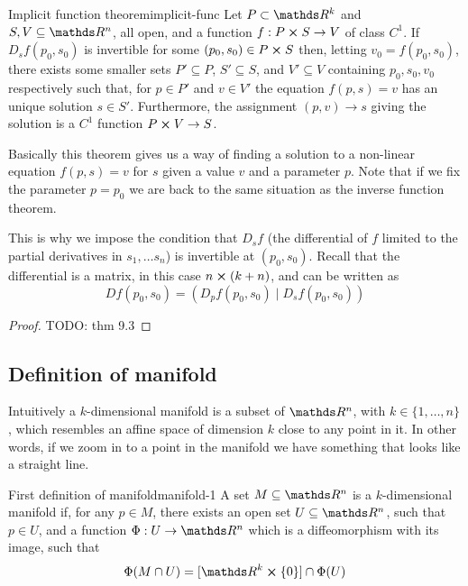 \documentclass[12pt]{extarticle}
\begin{document}
\begin{theorem}{Implicit function theorem}{implicit-func}
	Let $P \subset \R^k$ and $S, V \subseteq \R^n$, all open, and a function $f: P \cross S \to V$ of
	class $C^1$.
	If $D_s f(p_0, s_0)$ is invertible for some $(p_0, s_0) \in P \cross S$ then, letting
	$v_0 = f(p_0, s_0)$, there exists some smaller sets $P' \subseteq P$, $S'\subseteq S$, and
	$V' \subseteq V$ containing $p_0, s_0, v_0$ respectively such that, for $p \in P'$ and $v \in V'$
	the equation $f(p, s) = v$ has an unique solution $s \in S'$.
	Furthermore, the assignment $(p, v) \to s$ giving the solution is a $C^1$ function
	$P \cross V \to S$.
\end{theorem}

Basically this theorem gives us a way of finding a solution to a non-linear equation $f(p, s) = v$
for $s$ given a value $v$ and a parameter $p$.
Note that if we fix the parameter $p = p_0$ we are back to the same situation as the inverse
function theorem.

This is why we impose the condition that $D_s f$ (the differential of $f$ limited to the partial
derivatives in $s_1, \dots s_n$) is invertible at $(p_0, s_0)$.
Recall that the differential is a matrix, in this case $n \cross (k + n)$, and can be written as
\begin{equation}
	Df(p_0, s_0) = (D_p f(p_0, s_0) \mid D_s f(p_0, s_0))
\end{equation}

\begin{proof}
	TODO: thm 9.3
\end{proof}

\subsection{Definition of manifold}

Intuitively a $k$-dimensional manifold is a subset of $\R^n$, with $k \in \{1, \dots, n\}$, which
resembles an affine space of dimension $k$ close to any point in it. In other words, if we zoom in
to a point in the manifold we have something that looks like a straight line.

\begin{definition}{First definition of manifold}{manifold-1}
	A set $M \subseteq \R^n$ is a $k$-dimensional manifold if, for any $p \in M$, there exists an open
	set $U \subseteq \R^n$, such that $p \in U$, and a function $\Phi : U \to \R^n$ which is a diffeomorphism with
	its image, such that
	\begin{equation}
		\Phi(M \cap U) = [\R^k \cross \{0\}] \cap \Phi(U)
	\end{equation}
\end{definition}
\end{document}
